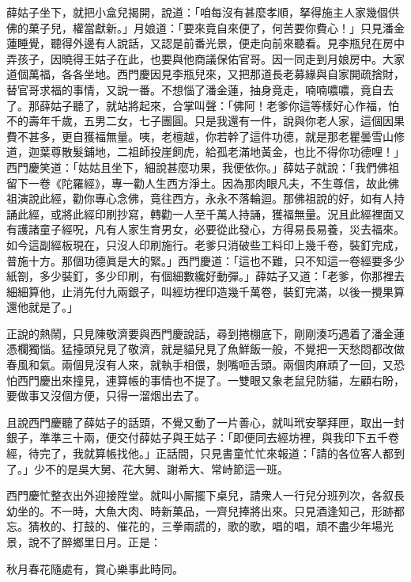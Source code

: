 薛姑子坐下，就把小盒兒揭開，說道：「咱每沒有甚麼孝順，拏得施主人家幾個供佛的菓子兒，權當獻新。」月娘道：「要來竟自來便了，何苦要你費心！」只見潘金蓮睡覺，聽得外邊有人說話，又認是前番光景，便走向前來聽看。見李瓶兒在房中弄孩子，因曉得王姑子在此，也要與他商議保佑官哥。因一同走到月娘房中。大家道個萬福，各各坐地。西門慶因見李瓶兒來，又把那道長老募緣與自家開疏捨財，替官哥求福的事情，又說一番。不想惱了潘金蓮，抽身竟走，喃喃噥噥，竟自去了。那薛姑子聽了，就站將起來，合掌叫聲：「佛阿！老爹你這等樣好心作福，怕不的壽年千歲，五男二女，七子團圓。只是我還有一件，說與你老人家，這個因果費不甚多，更自獲福無量。咦，老檀越，你若幹了這件功德，就是那老瞿曇雪山修道，迦葉尊散髮鋪地，二祖師投崖飼虎，給孤老滿地黃金，也比不得你功德哩！」西門慶笑道：「姑姑且坐下，細說甚麼功果，我便依你。」薛姑子就說：「我們佛祖留下一卷《陀羅經》，專一勸人生西方淨土。因為那肉眼凡夫，不生尊信，故此佛祖演說此經，勸你專心念佛，竟往西方，永永不落輪迴。那佛祖說的好，如有人持誦此經，或將此經印刷抄寫，轉勸一人至千萬人持誦，獲福無量。況且此經裡面又有護諸童子經呪，凡有人家生育男女，必要從此發心，方得易長易養，災去福來。如今這副經板現在，只沒人印刷施行。老爹只消破些工料印上幾千卷，裝釘完成，普施十方。那個功德眞是大的緊。」西門慶道：「這也不難，只不知這一卷經要多少紙劄，多少裝釘，多少印刷，有個細數纔好動彈。」薛姑子又道：「老爹，你那裡去細細算他，{}止消先付九兩銀子，叫經坊裡印造幾千萬卷，裝釘完滿，以後一攪果算還他就是了。」

正說的熱鬧，只見陳敬濟要與西門慶說話，尋到捲棚底下，剛剛湊巧遇着了潘金蓮憑欄獨惱。猛擡頭兒見了敬濟，就是貓兒見了魚鮮飯一般，不覺把一天愁悶都改做春風和氣。{}兩個見沒有人來，就執手相偎，剝嘴咂舌頭。兩個肉麻頑了一回，又恐怕西門慶出來撞見，連算帳的事情也不提了。一雙眼又象老鼠兒防貓，左顧右盼，要做事又沒個方便，{}只得一溜烟出去了。

且說西門慶聽了薛姑子的話頭，不覺又動了一片善心，就叫玳安拏拜匣，取出一封銀子，準準三十兩，便交付薛姑子與王姑子：「即便同去經坊裡，與我印下五千卷經，待完了，我就算帳找他。」正話間，只見書童忙忙來報道：「請的各位客人都到了。」少不的是吳大舅、花大舅、謝希大、常峙節這一班。

西門慶忙整衣出外迎接陞堂。就叫小厮擺下桌兒，請衆人一行兒分班列次，各叙長幼坐的。不一時，大魚大肉、時新菓品，一齊兒捧將出來。只見酒逢知己，形跡都忘。猜枚的、打鼓的、催花的，三拳兩謊的，歌的歌，唱的唱，頑不盡少年場光景，說不了醉鄉里日月。{}正是：

\begin{myquote} 
秋月春花隨處有，賞心樂事此時同。
\end{myquote} 

